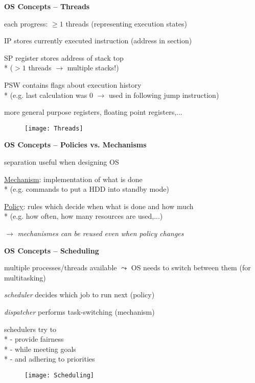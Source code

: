 \textbf{OS Concepts -- Threads}
\begin{items}
	\item each progress: \( \geq 1 \) threads (representing execution states)
	\item IP stores currently executed instruction (address in  section)
	\item SP register stores address of stack top \\* (\( > 1 \) threads \( \to \) multiple stacks!)
	\item PSW contains flags about execution history \\* (e.g. last calculation was 0 \( \to \) used in following jump instruction)
	\item more general purpose registers, floating point registers,...
\end{items}
\begin{figure}[H]\centering\label{Threads}\texttt{[image: Threads]}\end{figure}

\textbf{OS Concepts -- Policies vs. Mechanisms}
\begin{items}
	\item separation useful when designing OS
	\item \underline{Mechanism}: implementation of what is done \\* (e.g. commands to put a HDD into standby mode)
	\item \underline{Policy}: rules which decide when what is done and how much \\* (e.g. how often, how many resources are used,...)
	\item \( \to \) \emph{mechanismes can be reused even when policy changes}
\end{items}

\textbf{OS Concepts -- Scheduling}
\begin{items}
	\item multiple processes/threads available \( \leadsto \) OS needs to switch between them (for multitasking)
	\item \emph{scheduler} decides which job to run next (policy)
	\item \emph{dispatcher} performs task-switching (mechanism)
	\item schedulers try to \\*
		- provide fairness \\*
		- while meeting goals \\*
		- and adhering to priorities
\end{items}
\begin{figure}[H]\centering\label{Scheduling}\texttt{[image: Scheduling]}\end{figure}

